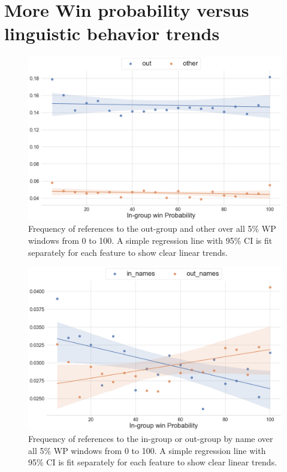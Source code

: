 \chapter{More Win probability versus linguistic behavior trends}
\label{appendix:figs}

\begin{figure}[H]
     \centering
     \includegraphics[width=\linewidth]{figures/trends-3.png}
     \caption{Frequency of references to the out-group and other over all 5\% WP windows from 0 to 100. A simple regression line with 95\% CI is fit separately for each feature to show clear linear trends.}
     \label{fig:trends-3}
 \end{figure}


\begin{figure}[H]
      \centering
      \includegraphics[width=\linewidth]{figures/trends-4.png}
      \caption{Frequency of references to the in-group or out-group by name over all 5\% WP windows from 0 to 100. A simple regression line with 95\% CI is fit separately for each feature to show clear linear trends.}
      \label{fig:trends-4}
  \end{figure}
